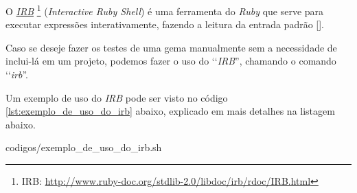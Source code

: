 O \emph{\href{http://www.ruby-doc.org/stdlib-2.0/libdoc/irb/rdoc/IRB.html}{IRB}} 
\footnote{IRB: \url{http://www.ruby-doc.org/stdlib-2.0/libdoc/irb/rdoc/IRB.html}}
(\emph{Interactive Ruby Shell}) é uma ferramenta do \emph{Ruby} que serve para executar expressões
interativamente, fazendo a leitura da entrada padrão [].

Caso se deseje fazer os testes de uma gema manualmente sem a necessidade de inclui-lá em um projeto, podemos
fazer o uso do ‘‘\emph{IRB}'', chamando o comando ‘‘\emph{irb}''.

Um exemplo de uso do \emph{IRB} pode ser visto 
no código \ref{lst:exemplo_de_uso_do_irb}
abaixo, explicado em mais detalhes na listagem abaixo. 

{codigos/exemplo_de_uso_do_irb.sh}

